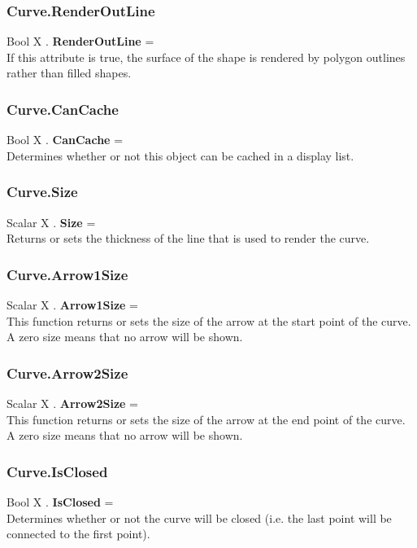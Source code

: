 \documentclass[10pt]{book}
\begin{document}
\subsubsection{Curve.RenderOutLine \label{F:Curve:RenderOutLine}}
Bool X . \textbf{RenderOutLine} = \\
If this attribute is true, the surface of the shape is rendered by polygon outlines rather than filled shapes.

\subsubsection{Curve.CanCache \label{F:Curve:CanCache}}
Bool X . \textbf{CanCache} = \\
Determines whether or not this object can be cached in a display list.

\subsubsection{Curve.Size \label{F:Curve:Size}}
Scalar X . \textbf{Size} = \\
Returns or sets the thickness of the line that is used to render the curve.

\subsubsection{Curve.Arrow1Size \label{F:Curve:Arrow1Size}}
Scalar X . \textbf{Arrow1Size} = \\
This function returns or sets the size of the arrow at the start point of the curve. A zero size means that no arrow will be shown.

\subsubsection{Curve.Arrow2Size \label{F:Curve:Arrow2Size}}
Scalar X . \textbf{Arrow2Size} = \\
This function returns or sets the size of the arrow at the end point of the curve. A zero size means that no arrow will be shown.

\subsubsection{Curve.IsClosed \label{F:Curve:IsClosed}}
Bool X . \textbf{IsClosed} = \\
Determines whether or not the curve will be closed (i.e. the last point will be connected to the first point).
\end{document}
